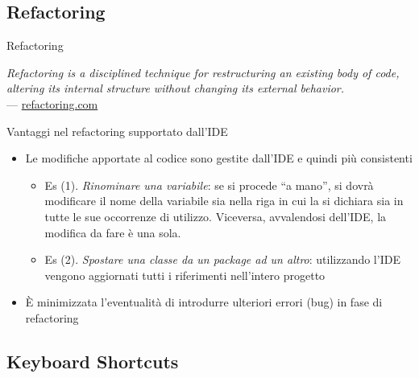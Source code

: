 \documentclass[presentation]{beamer}
\begin{document}

\subsection{Refactoring}
\begin{frame}{Refactoring}
	\begin{block}{}
		\emph{Refactoring is a disciplined technique for restructuring an existing body of code, altering its internal structure without changing its external behavior.}\\--- \url{refactoring.com}
	\end{block}
	\begin{block}{Vantaggi nel refactoring supportato dall'IDE}
		\begin{itemize}
			\item Le modifiche apportate al codice sono gestite dall'IDE e quindi più consistenti
			\begin{itemize}
				\item \footnotesize{Es (1). \emph{Rinominare una variabile}: se si procede ``a mano'', si dovrà modificare il nome della variabile sia nella riga in cui la si dichiara sia in tutte le sue occorrenze di utilizzo. Viceversa, avvalendosi dell'IDE, la modifica da fare è una sola.}
				\item \footnotesize{Es (2). \emph{Spostare una classe da un package ad un altro}: utilizzando l'IDE vengono aggiornati tutti i riferimenti nell'intero progetto}
			\end{itemize}
			\item \`{E} minimizzata l'eventualità di introdurre ulteriori errori (bug) in fase di refactoring
		\end{itemize}
	\end{block}
\end{frame}


\subsection{Keyboard Shortcuts}
\end{document}

